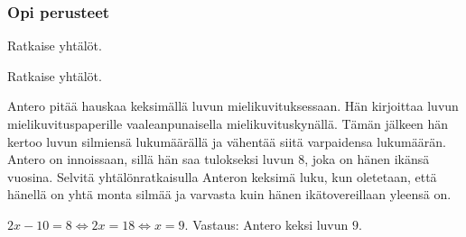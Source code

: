 \begin{tehtavasivu}

\subsubsection*{Opi perusteet}

\begin{tehtava}
    Ratkaise yhtälöt.
    \begin{alakohdat}
    \end{alakohdat}
    \begin{vastaus}
        \begin{alakohdat}
        \end{alakohdat}
    \end{vastaus}
\end{tehtava}

\begin{tehtava}
    Ratkaise yhtälöt.
    \begin{alakohdat}
    \end{alakohdat}
    \begin{vastaus}
        \begin{alakohdat}
        \end{alakohdat}
    \end{vastaus}
\end{tehtava}

\begin{tehtava}
    Antero pitää hauskaa keksimällä luvun mielikuvituksessaan. Hän kirjoittaa luvun mielikuvituspaperille vaaleanpunaisella mielikuvituskynällä. Tämän jälkeen hän kertoo luvun silmiensä lukumäärällä ja vähentää siitä varpaidensa lukumäärän. Antero on innoissaan, sillä hän saa tulokseksi luvun $8$, joka on hänen ikänsä vuosina. Selvitä yhtälönratkaisulla Anteron keksimä luku, kun oletetaan, että hänellä on yhtä monta silmää ja varvasta kuin hänen ikätovereillaan yleensä on.
    \begin{vastaus}
        $2x-10=8 \Leftrightarrow 2x=18 \Leftrightarrow x=9$. Vastaus: Antero keksi luvun $9$.
    \end{vastaus}
\end{tehtava}


\end{tehtavasivu}
